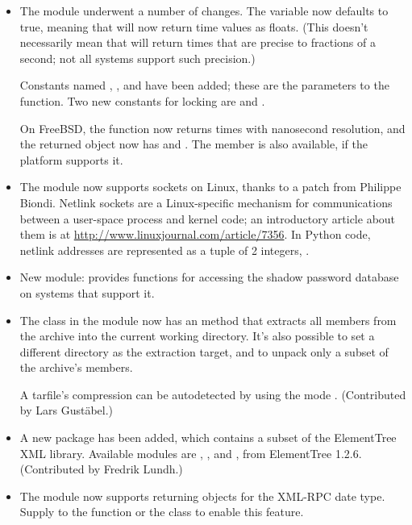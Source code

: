 \documentclass{howto}
\begin{document}
\begin{itemize}


\item The  module underwent a number of changes.  The
 variable now defaults to true, meaning that
 will now return time values as floats.  (This
doesn't necessarily mean that  will return times
that are precise to fractions of a second; not all systems support
such precision.)

Constants named , , and
 have been added; these are the parameters to the
 function.  Two new constants for locking are
 and .

On FreeBSD, the  function now returns 
times with nanosecond resolution, and the returned object
now has  and .
The  member is also available, if the platform supports it.

\item The  module now supports 
sockets on Linux, thanks to a patch from Philippe Biondi.  
Netlink sockets are a Linux-specific mechanism for communications
between a user-space process and kernel code; an introductory 
article about them is at \url{http://www.linuxjournal.com/article/7356}.
In Python code, netlink addresses are represented as a tuple of 2 integers, 
.

\item New module:  provides functions for accessing the
shadow password database on systems that support it.  

\item The  class in the  module now has
an  method that extracts all members from the
archive into the current working directory.  It's also possible to set
a different directory as the extraction target, and to unpack only a
subset of the archive's members.  

A tarfile's compression can be autodetected by 
using the mode .
(Contributed by Lars Gust\"abel.)

\item A new package  has been added, which contains
a subset of the ElementTree XML library.  Available modules are
, , and
, from ElementTree 1.2.6. (Contributed by
Fredrik Lundh.)

\item The  module now supports returning 
       objects for the XML-RPC date type.  Supply 
       to the  function
      or the  class to enable this feature.


\end{itemize}
\end{document}
